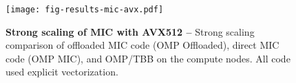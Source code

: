 
\begin{figure}[!hbt]

  \centering
  \texttt{[image: fig-results-mic-avx.pdf]}

  \caption{\textbf{Strong scaling of MIC with AVX512 --} Strong scaling comparison of offloaded MIC code (OMP Offloaded), direct MIC code (OMP MIC), and OMP/TBB on the compute nodes. All code used explicit vectorization.}

  \label{fig-results-mic-avx}

\end{figure}
